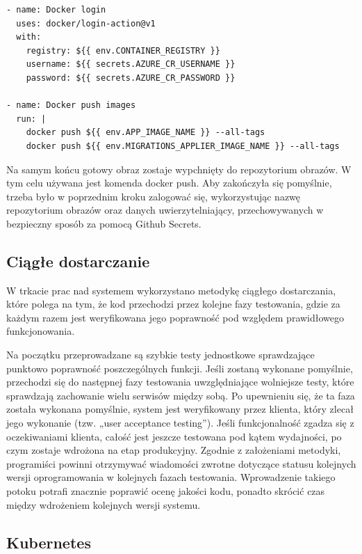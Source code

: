 \documentclass[11pt, a4]{article} %
\begin{document}
\begin{lstlisting}
- name: Docker login
  uses: docker/login-action@v1
  with:
    registry: ${{ env.CONTAINER_REGISTRY }}
    username: ${{ secrets.AZURE_CR_USERNAME }}
    password: ${{ secrets.AZURE_CR_PASSWORD }}

- name: Docker push images
  run: |
    docker push ${{ env.APP_IMAGE_NAME }} --all-tags
    docker push ${{ env.MIGRATIONS_APPLIER_IMAGE_NAME }} --all-tags
\end{lstlisting}

Na samym końcu gotowy obraz zostaje wypchnięty do repozytorium obrazów. W tym celu 
używana jest komenda docker push. Aby zakończyła się pomyślnie, trzeba było 
w poprzednim kroku zalogować się, wykorzystując nazwę repozytorium obrazów oraz 
danych uwierzytelniający, przechowywanych w bezpieczny sposób za pomocą Github 
Secrets.

\subsection{Ciągłe dostarczanie}

W trkacie prac nad systemem wykorzystano metodykę ciągłego dostarczania, które polega na tym, że kod 
przechodzi przez kolejne fazy testowania, gdzie za każdym razem jest weryfikowana jego poprawność pod 
względem prawidłowego funkcjonowania. 

Na początku przeprowadzane są szybkie testy jednostkowe sprawdzające punktowo poprawność 
poszczególnych funkcji. Jeśli zostaną wykonane pomyślnie, przechodzi się do następnej fazy 
testowania uwzględniające wolniejsze testy, które sprawdzają zachowanie wielu serwisów między 
sobą. Po upewnieniu się, że ta faza została wykonana pomyślnie, system jest weryfikowany przez 
klienta, który zlecał jego wykonanie (tzw. „user acceptance testing”). Jeśli funkcjonalność zgadza się z 
oczekiwaniami klienta, całość jest jeszcze testowana pod kątem wydajności, po czym zostaje 
wdrożona na etap produkcyjny.
Zgodnie z założeniami metodyki, programiści powinni otrzymywać
wiadomości zwrotne dotyczące statusu kolejnych wersji 
oprogramowania w kolejnych fazach testowania. Wprowadzenie takiego potoku potrafi znacznie
poprawić ocenę jakości kodu, ponadto skrócić czas między wdrożeniem kolejnych wersji systemu.

\subsection{Kubernetes}
\end{document}
